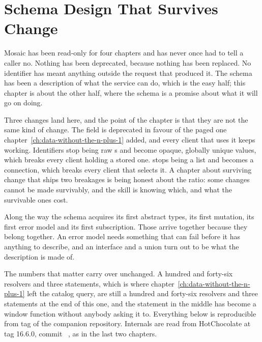 \chapter{Schema Design That Survives Change}
\label{ch:schema-design-that-survives-change}

Mosaic has been read-only for four chapters and has never once had to tell a
caller no. Nothing has been deprecated, because nothing has been replaced. No
identifier has meant anything outside the request that produced it. The schema
has been a description of what the service can do, which is the easy half; this
chapter is about the other half, where the schema is a promise about what it
will go on doing.

Three changes land here, and the point of the chapter is that they are not the
same kind of change. The  field is deprecated in favour of the
paged one chapter~\ref{ch:data-without-the-n-plus-1} added, and every client
that uses it keeps working. Identifiers stop being raw s and become
opaque, globally unique values, which breaks every client holding a stored one.
 stops being a list and becomes a connection, which breaks
every client that selects it. A chapter about surviving change that ships two
breakages is being honest about the ratio: some changes cannot be made
survivably, and the skill is knowing which, and what the survivable ones cost.

Along the way the schema acquires its first abstract types, its first mutation,
its first error model and its first subscription. Those arrive together because
they belong together. An error model needs something that can fail before it has
anything to describe, and an interface and a union turn out to be what the
description is made of.

The numbers that matter carry over unchanged. A hundred and forty-six resolvers
and three statements, which is where
chapter~\ref{ch:data-without-the-n-plus-1} left the catalog query, are still a
hundred and forty-six resolvers and three statements at the end of this one, and
the statement in the middle has become a window function without anybody asking
it to. Everything below is reproducible from tag  of the companion
repository. Internals are read from HotChocolate at tag 16.6.0, commit
~\autocite{chillicream2026source}, as in the last two chapters.








